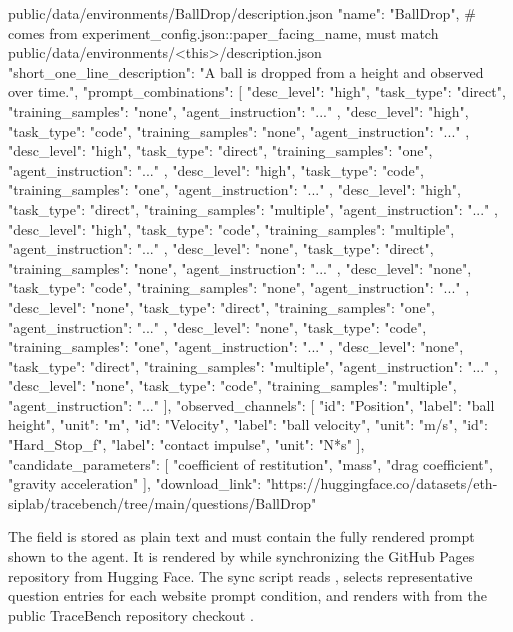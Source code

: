 \documentclass[11pt]{article}
\begin{document}
\begin{DocCode}
public/data/environments/BallDrop/description.json
{
  "name": "BallDrop", # comes from experiment_config.json::paper_facing_name, must match public/data/environments/<this>/description.json
  "short_one_line_description": "A ball is dropped from a height and observed over time.",
  "prompt_combinations": [
    {
      "desc_level": "high",
      "task_type": "direct",
      "training_samples": "none",
      "agent_instruction": "..."
    },
    {
      "desc_level": "high",
      "task_type": "code",
      "training_samples": "none",
      "agent_instruction": "..."
    },
    {
      "desc_level": "high",
      "task_type": "direct",
      "training_samples": "one",
      "agent_instruction": "..."
    },
    {
      "desc_level": "high",
      "task_type": "code",
      "training_samples": "one",
      "agent_instruction": "..."
    },
    {
      "desc_level": "high",
      "task_type": "direct",
      "training_samples": "multiple",
      "agent_instruction": "..."
    },
    {
      "desc_level": "high",
      "task_type": "code",
      "training_samples": "multiple",
      "agent_instruction": "..."
    },
    {
      "desc_level": "none",
      "task_type": "direct",
      "training_samples": "none",
      "agent_instruction": "..."
    },
    {
      "desc_level": "none",
      "task_type": "code",
      "training_samples": "none",
      "agent_instruction": "..."
    },
    {
      "desc_level": "none",
      "task_type": "direct",
      "training_samples": "one",
      "agent_instruction": "..."
    },
    {
      "desc_level": "none",
      "task_type": "code",
      "training_samples": "one",
      "agent_instruction": "..."
    },
    {
      "desc_level": "none",
      "task_type": "direct",
      "training_samples": "multiple",
      "agent_instruction": "..."
    },
    {
      "desc_level": "none",
      "task_type": "code",
      "training_samples": "multiple",
      "agent_instruction": "..."
    }
  ],
  "observed_channels": [
    {"id": "Position", "label": "ball height", "unit": "m"},
    {"id": "Velocity", "label": "ball velocity", "unit": "m/s"},
    {"id": "Hard_Stop_f", "label": "contact impulse", "unit": "N*s"}
  ],
  "candidate_parameters": [
    "coefficient of restitution",
    "mass",
    "drag coefficient",
    "gravity acceleration"
  ],
  "download_link": "https://huggingface.co/datasets/eth-siplab/tracebench/tree/main/questions/BallDrop"
}
\end{DocCode}
The  field is stored as plain text and must contain the fully rendered prompt shown to the agent.
It is rendered by  while synchronizing the GitHub Pages repository from Hugging Face.
The sync script reads , selects representative question entries for each website prompt condition, and renders  with  from the public TraceBench repository checkout .
\end{document}

